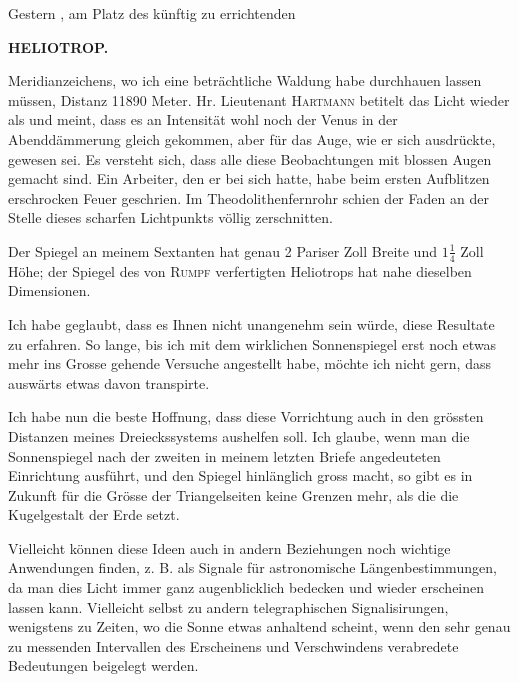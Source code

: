\par\noindent\hspace*{\parindent}Gestern , am Platz des künftig zu errichtenden 

\par\clearpage
\noindent\null\hfill{\small\textbf{HELIOTROP.}}\hfill{}\par\medskip
\noindent{} Meridianzeichens, wo ich eine beträchtliche Waldung habe durchhauen lassen müssen, Distanz 11890 Meter. Hr. Lieutenant \textsc{Hartmann} betitelt das Licht wieder als  und meint, dass es an Intensität wohl noch der Venus in der Abenddämmerung gleich gekommen, aber für das Auge, wie er sich ausdrückte,  gewesen sei. Es versteht sich, dass alle diese Beobachtungen mit blossen Augen gemacht sind. Ein Arbeiter, den er bei sich hatte, habe beim ersten Aufblitzen erschrocken Feuer geschrien. Im Theodolithenfernrohr schien der Faden an der Stelle dieses scharfen Lichtpunkts völlig zerschnitten.

\par\noindent\hspace*{\parindent}Der Spiegel an meinem Sextanten hat genau 2 Pariser Zoll Breite und $1\frac14$ Zoll Höhe; der Spiegel des von \textsc{Rumpf} verfertigten Heliotrops hat nahe dieselben Dimensionen.

\par\noindent\hspace*{\parindent}Ich habe geglaubt, dass es Ihnen nicht unangenehm sein würde, diese Resultate zu erfahren. So lange, bis ich mit dem wirklichen Sonnenspiegel erst noch etwas mehr ins Grosse gehende Versuche angestellt habe, möchte ich nicht gern, dass auswärts etwas davon transpirte.

\par\noindent\hspace*{\parindent}Ich habe nun die beste Hoffnung, dass diese Vorrichtung auch in den grössten Distanzen meines Dreieckssystems aushelfen soll. Ich glaube, wenn man die Sonnenspiegel nach der zweiten in meinem letzten Briefe angedeuteten Einrichtung ausführt, und den Spiegel hinlänglich gross macht, so gibt es in Zukunft für die Grösse der Triangelseiten keine Grenzen mehr, als die die Kugelgestalt der Erde setzt.

\par\noindent\hspace*{\parindent}Vielleicht können diese Ideen auch in andern Beziehungen noch wichtige Anwendungen finden, z. B. als Signale für astronomische Längenbestimmungen, da man dies Licht immer ganz augenblicklich bedecken und wieder erscheinen lassen kann. Vielleicht selbst zu andern telegraphischen Signalisirungen, wenigstens zu Zeiten, wo die Sonne etwas anhaltend scheint, wenn den sehr genau zu messenden Intervallen des Erscheinens und Verschwindens verabredete Bedeutungen beigelegt werden.

